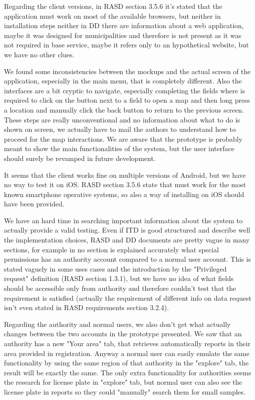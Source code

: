 Regarding the client versions, in RASD section 3.5.6 it's stated that the application must work on most of the available browsers, but neither in installation steps neither in DD there are information about a web application, maybe it was designed for municipalities and therefore is not present as it was not required in base service, maybe it refers only to an hypothetical website, but we have no other clues.

We found some inconsistencies between the mockups and the actual screen of the application, especially in the main menu, that is completely different. Also the interfaces are a bit cryptic to navigate, especially completing the fields where is required to click on the button next to a field to open a map and then long press a location and manually click the back button to return to the previous screen. These steps are really unconventional and no information about what to do is shown on screen, we actually have to mail the authors to understand how to proceed for the map interactions. We are aware that the prototype is probably meant to show the main functionalities of the system, but the user interface should surely be revamped in future development.

It seems that the client works fine on multiple versions of Android, but we have no way to test it on iOS. RASD section 3.5.6 state that must work for the most known smartphone operative systems, so also a way of installing on iOS should have been provided.

We have an hard time in searching important information about the system to actually provide a valid testing. Even if ITD is good structured and describe well the implementation choices, RASD and DD documents are pretty vague in many sections, for example in no section is explained accurately what special permissions has an authority account compared to a normal user account. This is stated vaguely in some uses cases and the introduction by the "Privileged request" definition (RASD section 1.3.1), but we have no idea of what fields should be accessible only from authority and therefore couldn't test that the requirement is satisfied (actually the requirement of different info on data request isn't even stated in RASD requirements section 3.2.4).

Regarding the authority and normal users, we also don't get what actually changes between the two accounts in the prototype presented. We saw that an authority has a new "Your area" tab, that retrieves automatically reports in their area provided in registration. Anyway a normal user can easily emulate the same functionality by using the same region of that authority in the "explore" tab, the result will be exactly the same. The only extra functionality for authorities seems the research for license plate in "explore" tab, but normal user can also see the license plate in reports so they could "manually" search them for small samples. 